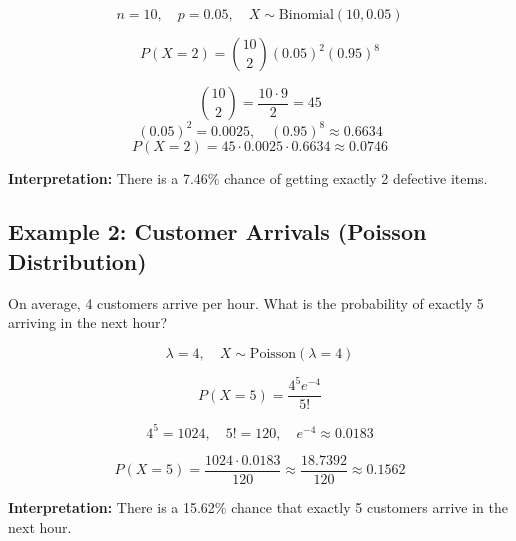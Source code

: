 \documentclass[12pt]{article}
\begin{document}
\[
n = 10, \quad p = 0.05, \quad X \sim \text{Binomial}(10, 0.05)
\]

\[
P(X = 2) = \binom{10}{2} (0.05)^2 (0.95)^8
\]

\[
\binom{10}{2} = \frac{10 \cdot 9}{2} = 45
\]
\[
(0.05)^2 = 0.0025, \quad (0.95)^8 \approx 0.6634
\]
\[
P(X = 2) = 45 \cdot 0.0025 \cdot 0.6634 \approx 0.0746
\]

\textbf{Interpretation:} There is a 7.46\% chance of getting exactly 2 defective items.

\subsection*{Example 2: Customer Arrivals (Poisson Distribution)}

On average, 4 customers arrive per hour. What is the probability of exactly 5 arriving in the next hour?

\[
\lambda = 4, \quad X \sim \text{Poisson}(\lambda = 4)
\]

\[
P(X = 5) = \frac{4^5 e^{-4}}{5!}
\]

\[
4^5 = 1024, \quad 5! = 120, \quad e^{-4} \approx 0.0183
\]

\[
P(X = 5) = \frac{1024 \cdot 0.0183}{120} \approx \frac{18.7392}{120} \approx 0.1562
\]

\textbf{Interpretation:} There is a 15.62\% chance that exactly 5 customers arrive in the next hour.
\end{document}
